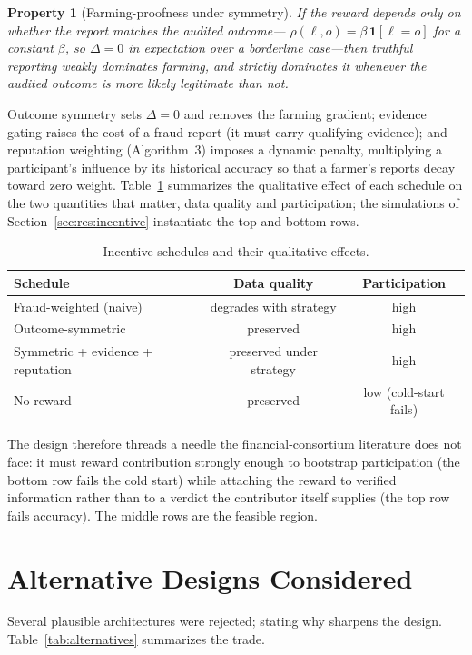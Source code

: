 \documentclass[11pt]{article}
\newtheorem{property}{Property}
\begin{document}
\begin{property}[Farming-proofness under symmetry]\label{prop:sym}
If the reward depends only on whether the report matches the audited outcome---
$\rho(\ell,o)=\beta\,\mathbf{1}[\ell=o]$ for a constant $\beta$, so $\Delta=0$ in
expectation over a borderline case---then truthful reporting weakly dominates
farming, and strictly dominates it whenever the audited outcome is more likely
legitimate than not.
\end{property}

\noindent Outcome symmetry sets $\Delta=0$ and removes the farming gradient;
evidence gating raises the cost of a fraud report (it must carry qualifying
evidence); and reputation weighting (Algorithm~3) imposes a dynamic penalty,
multiplying a participant's influence by its historical accuracy so that a farmer's
reports decay toward zero weight. Table~\ref{tab:schedules} summarizes the
qualitative effect of each schedule on the two quantities that matter, data
quality and participation; the simulations of Section~\ref{sec:res:incentive}
instantiate the top and bottom rows.

\begin{table}[t]\centering\small
\caption{Incentive schedules and their qualitative effects.}\label{tab:schedules}
\begin{tabular}{lcc}
\toprule
Schedule & Data quality & Participation\\
\midrule
\rowcolor{bad} Fraud-weighted (naive) & degrades with strategy & high\\
Outcome-symmetric & preserved & high\\
\rowcolor{good} Symmetric + evidence + reputation & preserved under strategy & high\\
No reward & preserved & low (cold-start fails)\\
\bottomrule
\end{tabular}
\end{table}

The design therefore threads a needle the financial-consortium literature does not
face: it must reward contribution strongly enough to bootstrap participation
(the bottom row fails the cold start) while attaching the reward to verified
information rather than to a verdict the contributor itself supplies (the top row
fails accuracy). The middle rows are the feasible region.

\section{Alternative Designs Considered}\label{sec:alternatives}
Several plausible architectures were rejected; stating why sharpens the design.
Table~\ref{tab:alternatives} summarizes the trade.
\end{document}
